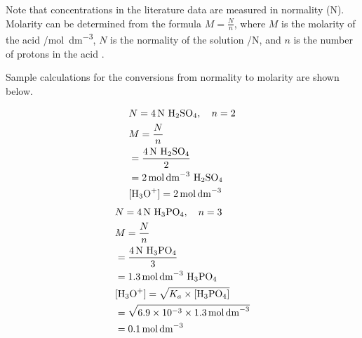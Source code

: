 \documentclass[11pt, letterpaper]{article}
\begin{document}
Note that concentrations in the literature data are measured in
normality (\unit{N}). Molarity can be determined from the
formula \(M = \frac{N}{n}\), where \(M\) is the molarity of the
acid /\unit{mol.dm^{-3}}, \(N\) is the normality of the solution
/\unit{N}, and \(n\) is the number of protons in the acid \cite{theorganicchemistrytutorHowCalculateNormality2017}.

Sample calculations for the conversions
from normality to molarity are shown below.

\begin{paracol}{2}
    \begin{align*}
         & N = \SI{4}{N}~ \ce{H_2SO_4},\quad n = 2
        \\
         & M = \frac{N}{n}
        \\
         & = \frac{\SI{4}{N}~ \ce{H_2SO_4}}{2}
        \\
         & = \SI{2}{mol.dm^{-3}}~ \ce{H_2SO_4}
        \\
         & \ce{[H_3O+]} = \SI{2}{mol.dm^{-3}}
    \end{align*}
    \switchcolumn
    \begin{align*}
         & N = \SI{4}{N}~ \ce{H_3PO_4},\quad n = 3
        \\
         & M = \frac{N}{n}
        \\
         & = \frac{\SI{4}{N}~ \ce{H_3PO_4}}{3}
        \\
         & = \SI{1.3}{mol.dm^{-3}}~ \ce{H_3PO_4}
        \\
         & \ce{[H_3O+]} = \sqrt{K_a \times \ce{[H_3PO_4]}}
        \\
         & = \sqrt{6.9 \times 10^{-3} \times \SI{1.3}{mol.dm^{-3}}}
        \\
         & = \SI{0.1}{mol.dm^{-3}}
    \end{align*}
\end{paracol}
\end{document}
